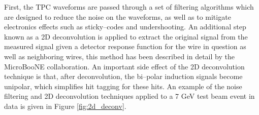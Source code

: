 First, the TPC waveforms are passed through a set of filtering algorithms which
are designed to reduce the noise on the waveforms, as well as to mitigate 
electronics effects such as sticky--codes and undershooting. An additional step
known as a 2D deconvolution is applied to extract the original signal from the
measured signal given a detector response function for the wire in question as
well as neighboring wires, this method has been described in detail by the 
MicroBooNE collaboration\cite{Adams:2018dra}. An important side
effect of the 2D deconvolution technique is that, after deconvolution, the
bi--polar induction signals become unipolar, which simplifies hit tagging for
these hits. An example of the noise filtering and 2D deconvolution techniques 
applied to a 7 GeV test beam event in \protodune{} data is given in Figure 
\ref{fig:2d_deconv}. 

